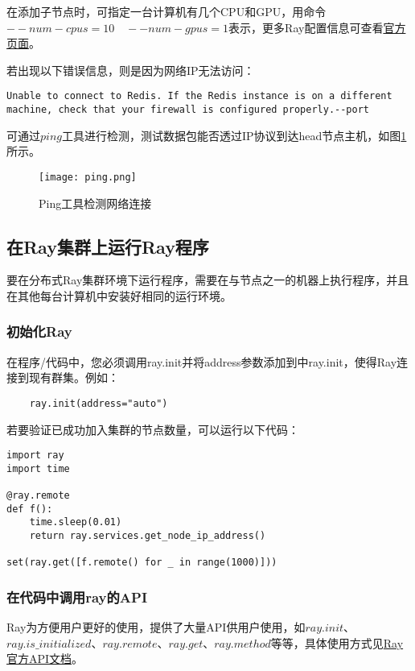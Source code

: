 在添加子节点时，可指定一台计算机有几个CPU和GPU，用命令$ --num-cpus=10 \quad --num-gpus=1 $表示，更多Ray配置信息可查看\href{https://docs.ray.io/en/master/configure.html#configuring-ray}{官方页面}。

若出现以下错误信息，则是因为网络IP无法访问：
\lstset{language=Bash, breaklines, columns=flexible}
\begin{lstlisting}
Unable to connect to Redis. If the Redis instance is on a different machine, check that your firewall is configured properly.--port
\end{lstlisting}

可通过$ ping $工具进行检测，测试数据包能否透过IP协议到达head节点主机，如图\ref{Ping工具检测网络连接}所示。
\begin{figure}[h]
    \centering
    \texttt{[image: ping.png]}
    \caption{Ping工具检测网络连接}
    \label{Ping工具检测网络连接}
\end{figure}

\subsection{在Ray集群上运行Ray程序}
要在分布式Ray集群环境下运行程序，需要在与节点之一的机器上执行程序，并且在其他每台计算机中安装好相同的运行环境。
\subsubsection{初始化Ray}
在程序/代码中，您必须调用ray.init并将address参数添加到中ray.init，使得Ray连接到现有群集。例如：
\lstset{language=Bash, breaklines, columns=flexible}
\begin{lstlisting}
    ray.init(address="auto")
\end{lstlisting}

若要验证已成功加入集群的节点数量，可以运行以下代码：
\lstset{language=python, breaklines, columns=flexible, numbers=left}
\begin{lstlisting}
import ray
import time

@ray.remote
def f():
    time.sleep(0.01)
    return ray.services.get_node_ip_address()

set(ray.get([f.remote() for _ in range(1000)]))
\end{lstlisting}

\subsubsection{在代码中调用ray的API}
Ray为方便用户更好的使用，提供了大量API供用户使用，如$ ray.init $、$ ray.is\_initialized $、$ ray.remote $、$ ray.get $、$ ray.method $等等，具体使用方式见\href{https://docs.ray.io/en/master/package-ref.html#}{Ray官方API文档}。